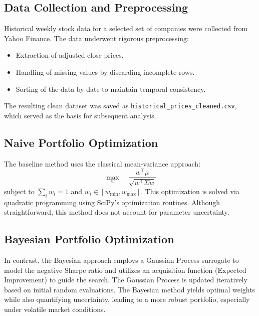 \documentclass[a4paper,12pt]{article}
\begin{document}
\subsection{Data Collection and Preprocessing}
Historical weekly stock data for a selected set of companies were collected from Yahoo Finance. The data underwent rigorous preprocessing:
\begin{itemize}
    \item Extraction of adjusted close prices.
    \item Handling of missing values by discarding incomplete rows.
    \item Sorting of the data by date to maintain temporal consistency.
\end{itemize}
The resulting clean dataset was saved as \texttt{historical\_prices\_cleaned.csv}, which served as the basis for subsequent analysis.

\subsection{Naive Portfolio Optimization}
The baseline method uses the classical mean-variance approach:
\[
\max_{w} \quad \frac{w^\top \mu}{\sqrt{w^\top \Sigma w}}
\]
subject to \( \sum_i w_i = 1 \) and \( w_i \in [w_{\min}, w_{\max}] \). This optimization is solved via quadratic programming using SciPy’s optimization routines. Although straightforward, this method does not account for parameter uncertainty.

\subsection{Bayesian Portfolio Optimization}
In contrast, the Bayesian approach employs a Gaussian Process surrogate to model the negative Sharpe ratio and utilizes an acquisition function (Expected Improvement) to guide the search. The Gaussian Process is updated iteratively based on initial random evaluations. The Bayesian method yields optimal weights while also quantifying uncertainty, leading to a more robust portfolio, especially under volatile market conditions.
\end{document}
